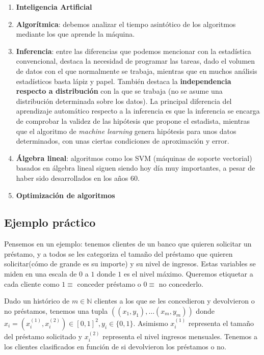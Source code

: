 \begin{enumerate}[i]
 \item \textbf{Inteligencia Artificial}
 \item \textbf{Algorítmica}: debemos analizar el tiempo asintótico de los algoritmos mediante los que aprende la máquina.
 \item \textbf{Inferencia}: entre las diferencias que podemos mencionar con la estadística convencional, destaca la necesidad de 
 programar las tareas, dado el volumen de datos con el que normalmente se trabaja, mientras que en muchos análisis estadísticos basta 
 lápiz y papel. También destaca la \textbf{independencia respecto a distribución} con la que se trabaja (no se asume una distribución
 determinada sobre los datos). La principal diferencia del aprendizaje automático respecto a la inferencia es que la inferencia
 se encarga de comprobar la validez de las hipótesis que propone el estadista, mientras que el algoritmo de 
 \textit{machine learning} genera hipótesis para unos datos determinados, con unas ciertas condiciones de aproximación y error.
 \item \textbf{Álgebra lineal}: algoritmos como los SVM (máquinas de soporte vectorial) basados en álgebra lineal siguen
 siendo hoy día muy importantes, a pesar de haber sido desarrollados en los años 60.
 \item \textbf{Optimización de algoritmos}
\end{enumerate}

\subsection{Ejemplo práctico}\label{sec:first-ex}
Pensemos en un ejemplo: tenemos clientes de un banco que quieren solicitar un préstamo, y a todos se les categoriza
el tamaño del préstamo que quieren solicitar(cómo de grande es su importe) y su nivel de ingresos. Estas variables se miden 
en una escala de $0$ a $1$ donde $1$ es el nivel máximo. Queremos etiquetar a cada cliente como $1\equiv$ conceder préstamo o 
$0\equiv$ no concederlo.

Dado un histórico de $m\in \mathbb{N}$ clientes a los que se les concedieron y devolvieron o no préstamos, tenemos una tupla 
$((x_1, y_1), \ldots (x_m, y_m))$ donde $x_i = (x_i^{(1)}, x_i^{(2)}) \in [0,1]^2, y_i \in \{0,1\}$. Asimismo $x_i^{(1)}$ representa el 
tamaño del préstamo solicitado y $x_i^{(2)}$ representa el nivel ingresos mensuales. Tenemos a los clientes clasificados en 
función de si devolvieron los préstamos o no.

